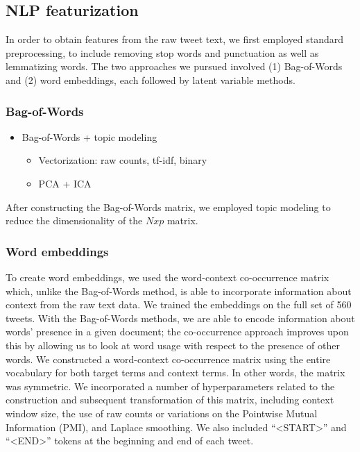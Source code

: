 \documentclass{article}
\begin{document}
\hypertarget{nlp-featurization}{%
\subsection{NLP featurization}\label{nlp-featurization}}

In order to obtain features from the raw tweet text, we first employed
standard preprocessing, to include removing stop words and punctuation
as well as lemmatizing words. The two approaches we pursued involved (1)
Bag-of-Words and (2) word embeddings, each followed by latent variable
methods.

\hypertarget{bag-of-words}{%
\subsubsection{Bag-of-Words}\label{bag-of-words}}

\begin{itemize}
\tightlist
\item
  Bag-of-Words + topic modeling

  \begin{itemize}
  \tightlist
  \item
    Vectorization: raw counts, tf-idf, binary
  \item
    PCA + ICA
  \end{itemize}
\end{itemize}

After constructing the Bag-of-Words matrix, we employed topic modeling
to reduce the dimensionality of the \(Nxp\) matrix.

\hypertarget{word-embeddings}{%
\subsubsection{Word embeddings}\label{word-embeddings}}

To create word embeddings, we used the word-context co-occurrence matrix
which, unlike the Bag-of-Words method, is able to incorporate
information about context from the raw text data. We trained the
embeddings on the full set of 560 tweets. With the Bag-of-Words methods,
we are able to encode information about words' presence in a given
document; the co-occurrence approach improves upon this by allowing us
to look at word usage with respect to the presence of other words. We
constructed a word-context co-occurrence matrix using the entire
vocabulary for both target terms and context terms. In other words, the
matrix was symmetric. We incorporated a number of hyperparameters
related to the construction and subsequent transformation of this
matrix, including context window size, the use of raw counts or
variations on the Pointwise Mutual Information (PMI), and Laplace
smoothing. We also included ``\textless START\textgreater{}'' and
``\textless END\textgreater{}'' tokens at the beginning and end of each
tweet.
\end{document}
